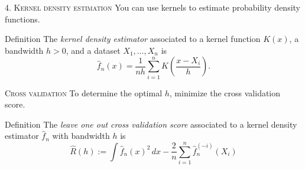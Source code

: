 \documentclass{beamer}
\begin{document}
\begin{frame}{\textsc{4. Kernel density estimation}}
    You can use kernels to estimate probability density functions.

    \begin{block}{Definition}
        The \emph{kernel density estimator} associated to a kernel function 
        $K(x)$, a bandwidth $h>0$, and a dataset $X_1,\ldots,X_n$ is
        \[
            \hat f_n(x) = \frac1{nh}\sum_{i=1}^n K\left(\frac{x - X_i}h\right).
        \]
    \end{block}
\end{frame}

\begin{frame}{{\large{\textsc{Cross validation}}}}
    To determine the optimal $h$, minimize the cross validation score.
    \begin{block}{Definition}
        The \emph{leave one out cross validation score} associated to a kernel density
        estimator $\hat f_n$ with bandwidth $h$ is
        \[
            \hat R(h) := \int\hat f_n(x)^2\,dx - \frac2n\sum_{i=1}^n\hat f_n^{(-i)}(X_i)
        \]
    \end{block}
\end{frame}
\end{document}
